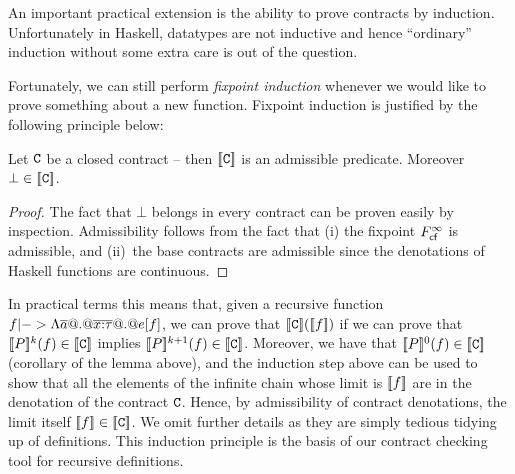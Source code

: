 \label{sect:induction}

An important practical extension is the ability to prove contracts by induction. Unfortunately in 
Haskell, datatypes are not inductive and hence ``ordinary'' induction without some extra care is 
out of the question.

Fortunately, we can still perform {\em fixpoint induction} whenever we would like to prove something 
about a new function. Fixpoint induction is justified by the following principle below:

\begin{lemma} Let ${\tt C}$ be a closed contract -- then $[\![{\tt C}]\!]$ is an 
admissible predicate. Moreover $\bot \in [\![{\tt C}]\!]$. \end{lemma}
\begin{proof}
The fact that $\bot$ belongs in every contract can be proven easily by inspection.
Admissibility follows from the fact that (i) the fixpoint $F_{\textsf{cf}}^{\infty}$ is admissible, 
and (ii)~the base contracts are admissible since the denotations of Haskell functions 
are continuous.
\end{proof}

In practical terms this means that, given a recursive function $f |-> \Lambda \overline{a} @.@ \overline{x{:}\tau} @.@ e[f]$, 
we can prove that $[\![{\tt C}]\!]([\![f]\!])$ if we can prove that 
$ [\![P]\!]^{k}(f) \in [\![{\tt C}]\!]$ implies $[\![P]\!]^{k+1}(f) \in [\![{\tt C}]\!]$. Moreover, we have that 
$ [\![P]\!]^{0}(f) \in [\![{\tt C}]\!]$ (corollary of the lemma above), and the induction step above can be 
used to show that all the elements of the infinite chain whose limit is $[\![f]\!]$ are in the denotation of 
the contract ${\tt C}$. Hence, by admissibility of contract denotations, the limit itself $[\![f]\!] \in [\![{\tt C}]\!]$. 
We omit further details as they are simply tedious tidying up of definitions. This induction principle is the basis
of our contract checking tool for recursive definitions.
